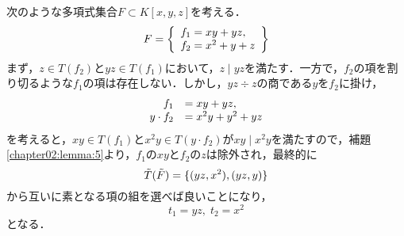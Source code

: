 \begin{example}
	次のような多項式集合$F\subset K[x, y, z]$を考える．
	\begin{equation}
		F = 
		\left\{
		\begin{array}{l}
			f_1 = xy + yz, \\
			f_2 = x^2 + y + z \notag
		\end{array}
		\right\}
	\end{equation}
	まず，$z \in T(f_2)$と$yz \in T(f_1)$において，$z \mid yz$を満たす．一方で，$f_2$の項を割り切るような$f_1$の項は存在しない．しかし，$yz \div z$の商である$y$を$f_2$に掛け，
	\begin{equation}
		\begin{array}{rl}
			f_1 &= xy + yz, \\
			y\cdot f_2 &= x^2y + y^2 + yz \notag
		\end{array}
	\end{equation}
	を考えると，$xy \in T(f_1)$と$x^2y \in T(y \cdot f_2)$が$xy \mid x^2y$を満たすので，補題\ref{chapter02:lemma:5}より，$f_1$の$xy$と$f_2$の$z$は除外され，最終的に
	\begin{equation}
		\tilde{T}(\tilde{F}) = \{ (yz, x^2), (yz, y) \} \notag
	\end{equation}
	から互いに素となる項の組を選べば良いことになり，
	$$t_1 = yz, \; t_2 = x^2$$
	となる．
\end{example}

